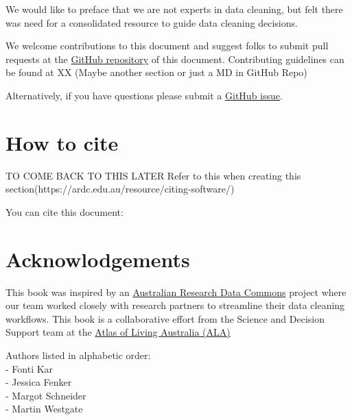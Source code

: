 \documentclass[
  letterpaper,
  DIV=11,
  numbers=noendperiod,
  oneside]{scrreprt}
\newenvironment{Shaded}{\begin{snugshade}}{\end{snugshade}}
\newcommand{\CommentTok}[1]{\textcolor[rgb]{0.37,0.37,0.37}{#1}}
\begin{document}
We would like to preface that we are not experts in data cleaning, but
felt there was need for a consolidated resource to guide data cleaning
decisions.

We welcome contributions to this document and suggest folks to submit
pull requests at the
\href{https://github.com/AtlasOfLivingAustralia/cleaning_data}{GitHub
repository} of this document. Contributing guidelines can be found at XX
(Maybe another section or just a MD in GitHub Repo)

Alternatively, if you have questions please submit a
\href{https://github.com/AtlasOfLivingAustralia/cleaning_data/issues}{GitHub
issue}.

\hypertarget{how-to-cite}{%
\section*{How to cite}\label{how-to-cite}}


TO COME BACK TO THIS LATER Refer to this when creating this
section(https://ardc.edu.au/resource/citing-software/)

You can cite this document:

\hypertarget{acknowlodgements}{%
\section*{Acknowlodgements}\label{acknowlodgements}}


This book was inspired by an \href{https://ardc.edu.au/}{Australian
Research Data Commons} project where our team worked closely with
research partners to streamline their data cleaning workflows. This book
is a collaborative effort from the Science and Decision Support team at
the \href{https://www.ala.org.au/}{Atlas of Living Australia (ALA)}

Authors listed in alphabetic order:\\
- Fonti Kar\\
- Jessica Fenker\\
- Margot Schneider\\
- Martin Westgate

\marginnote{\begin{footnotesize}

\begin{Shaded}
\begin{Highlighting}[]
\CommentTok{\#just testing an aside }
\end{Highlighting}
\end{Shaded}

\end{footnotesize}}
\end{document}
